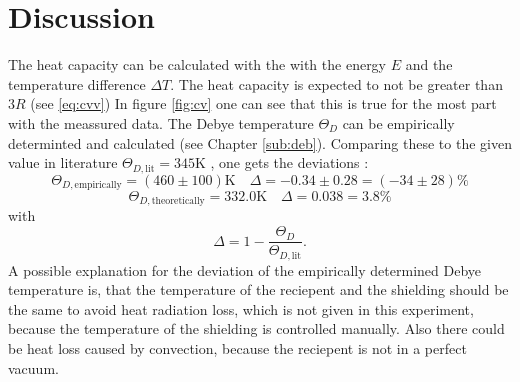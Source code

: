 \section{Discussion}
\label{sec:Diskussion}
The heat capacity can be calculated with the with the energy $E$ 
and the temperature difference $\Delta T$.
The heat capacity is expected to not be greater than $3 R$ (see \eqref{eq:cvv})
In figure \ref{fig:cv} one can see that this is true for the most part with the
meassured data.
\newline \newline
\noindent The Debye temperature $\Theta_D$ can be empirically determinted 
and calculated (see Chapter \ref{sub:deb}).
Comparing these to the given value in literature $\Theta_{D,\text{lit}} = 345 \si{\kelvin}$ \cite{deb_kupfer},
one gets the deviations :
\begin{equation*}
    \Theta_{D,\text{empirically}} =(460 \pm 100) \si{\kelvin}
    \quad \Delta =  -0.34 \pm 0.28 = (-34 \pm 28) \%
\end{equation*}
\begin{equation*}
    \Theta_{D,\text{theoretically}} = 332.0 \si{\kelvin}
    \quad \Delta = 0.038 = 3.8\%
\end{equation*}
with
\begin{equation*}
    \Delta = 1- \frac{\Theta_D}{\Theta_{D,\text{lit}} }.
\end{equation*}
\noindent A possible explanation
for the deviation of the empirically determined Debye temperature is, 
that the temperature of the reciepent and the shielding should be the same
to avoid heat radiation loss,
which is not given in this experiment,
because the temperature of the shielding is controlled manually.
Also there could be heat loss caused by convection, 
because the reciepent is not in a perfect vacuum.